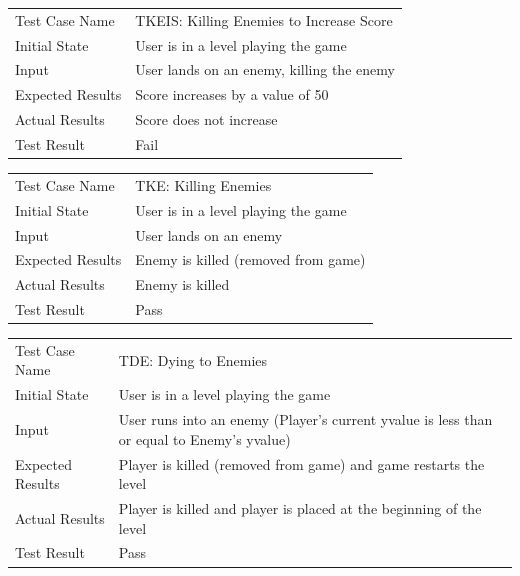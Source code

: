 \documentclass[12pt, titlepage]{article}
\begin{document}
\begin{center}
\begin{tabular}{ | l | p{10cm} | }
\hline
Test Case Name & TKEIS: Killing Enemies to Increase Score	\\
Initial State & User is in a level playing the game	\\
Input & User lands on an enemy, killing the enemy \hspace*{4 in} \\
Expected Results & Score increases by a value of 50	\\
Actual Results & Score does not increase	\\
Test Result & Fail	\\
\hline
\end{tabular}
\end{center}

\begin{center}
\begin{tabular}{ | l | p{10cm} | }
\hline
Test Case Name & TKE: Killing Enemies	\\
Initial State & User is in a level playing the game	\\
Input & User lands on an enemy 	\\
Expected Results & Enemy is killed (removed from game)	 \hspace*{4 in}\\
Actual Results & Enemy is killed	\\
Test Result & Pass	\\
\hline
\end{tabular}
\end{center}

\begin{center}
\begin{tabular}{ | l | p{10cm} | }
\hline
Test Case Name & TDE: Dying to Enemies	\\
Initial State & User is in a level playing the game	\\
Input & User runs into an enemy (Player's current yvalue is less than or equal to Enemy's yvalue)	\\
Expected Results & Player is killed (removed from game) and game restarts the level	\\
Actual Results & Player is killed and player is placed at the beginning of the level	\\
Test Result & Pass	\\
\hline
\end{tabular}
\end{center}
\end{document}
